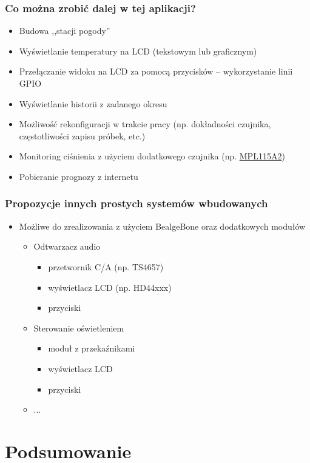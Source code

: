 \documentclass[dvipsnames,table]{beamer}
\begin{document}
\begin{frame}
\frametitle{Co można zrobić dalej w tej aplikacji?}
\begin{itemize}
	\item Budowa ,,stacji pogody''
	\item Wyświetlanie temperatury na LCD (tekstowym lub graficznym)
	\item Przełączanie widoku na LCD za pomocą przycisków -- wykorzystanie linii GPIO
	\item Wyświetlanie historii z zadanego okresu
	\item Możliwość rekonfiguracji w trakcie pracy (np. dokładności czujnika, częstotliwości zapisu próbek, etc.)
	\item Monitoring ciśnienia z użyciem dodatkowego czujnika (np. \href{http://www.freescale.com/files/sensors/doc/data_sheet/MPL115A2.pdf}{MPL115A2})
	\item Pobieranie prognozy z internetu
\end{itemize}
\end{frame}

\begin{frame}
\frametitle{Propozycje innych prostych systemów wbudowanych}
\begin{itemize}
	\item Możliwe do zrealizowania z użyciem BealgeBone oraz dodatkowych modułów
	\begin{itemize}
		\item Odtwarzacz audio
		\begin{itemize}
			\item przetwornik C/A (np. TS4657)
			\item wyświetlacz LCD (np. HD44xxx)
			\item przyciski
		\end{itemize}
		\item Sterowanie oświetleniem
		\begin{itemize}
			\item moduł z przekaźnikami
			\item wyświetlacz LCD
			\item przyciski
		\end{itemize}
		\item ...
	\end{itemize}
\end{itemize}
\end{frame}


\section{Podsumowanie}
\end{document}
